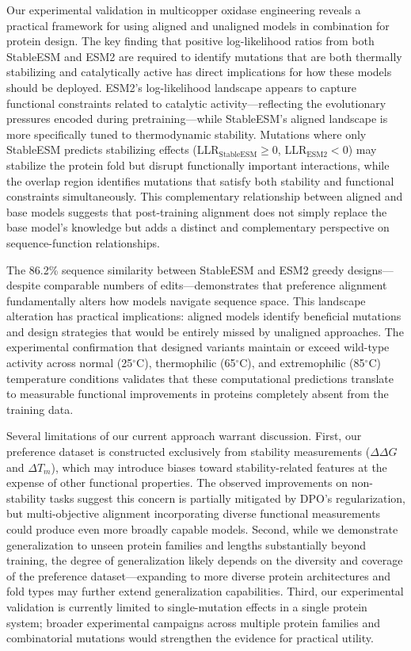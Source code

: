 \documentclass[]{fairmeta}
\begin{document}
Our experimental validation in multicopper oxidase engineering reveals a practical framework for using aligned and unaligned models in combination for protein design.
The key finding that positive log-likelihood ratios from both StableESM and ESM2 are required to identify mutations that are both thermally stabilizing and catalytically active has direct implications for how these models should be deployed.
ESM2's log-likelihood landscape appears to capture functional constraints related to catalytic activity—reflecting the evolutionary pressures encoded during pretraining—while StableESM's aligned landscape is more specifically tuned to thermodynamic stability.
Mutations where only StableESM predicts stabilizing effects (LLR$_{\text{StableESM}} \geq 0$, LLR$_{\text{ESM2}} < 0$) may stabilize the protein fold but disrupt functionally important interactions, while the overlap region identifies mutations that satisfy both stability and functional constraints simultaneously.
This complementary relationship between aligned and base models suggests that post-training alignment does not simply replace the base model's knowledge but adds a distinct and complementary perspective on sequence-function relationships.

The 86.2\% sequence similarity between StableESM and ESM2 greedy designs—despite comparable numbers of edits—demonstrates that preference alignment fundamentally alters how models navigate sequence space.
This landscape alteration has practical implications: aligned models identify beneficial mutations and design strategies that would be entirely missed by unaligned approaches.
The experimental confirmation that designed variants maintain or exceed wild-type activity across normal (25$^\circ$C), thermophilic (65$^\circ$C), and extremophilic (85$^\circ$C) temperature conditions validates that these computational predictions translate to measurable functional improvements in proteins completely absent from the training data.

Several limitations of our current approach warrant discussion.
First, our preference dataset is constructed exclusively from stability measurements ($\Delta\Delta G$ and $\Delta T_m$), which may introduce biases toward stability-related features at the expense of other functional properties.
The observed improvements on non-stability tasks suggest this concern is partially mitigated by DPO's regularization, but multi-objective alignment incorporating diverse functional measurements could produce even more broadly capable models.
Second, while we demonstrate generalization to unseen protein families and lengths substantially beyond training, the degree of generalization likely depends on the diversity and coverage of the preference dataset—expanding to more diverse protein architectures and fold types may further extend generalization capabilities.
Third, our experimental validation is currently limited to single-mutation effects in a single protein system; broader experimental campaigns across multiple protein families and combinatorial mutations would strengthen the evidence for practical utility.
\end{document}
